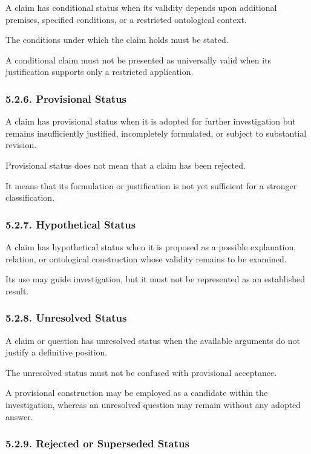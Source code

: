 A claim has conditional status
when its validity depends upon
additional premises, specified
conditions, or a restricted
ontological context.

The conditions under which
the claim holds must be stated.

A conditional claim must not
be presented as universally
valid when its justification
supports only a restricted
application.

\subsubsection*{5.2.6. Provisional Status}

A claim has provisional status
when it is adopted for further
investigation but remains
insufficiently justified,
incompletely formulated, or
subject to substantial revision.

Provisional status does not
mean that a claim has been
rejected.

It means that its formulation
or justification is not yet
sufficient for a stronger
classification.

\subsubsection*{5.2.7. Hypothetical Status}

A claim has hypothetical status
when it is proposed as a possible
explanation, relation, or
ontological construction whose
validity remains to be examined.

Its use may guide investigation,
but it must not be represented
as an established result.

\subsubsection*{5.2.8. Unresolved Status}

A claim or question has unresolved
status when the available
arguments do not justify
a definitive position.

The unresolved status must
not be confused with provisional
acceptance.

A provisional construction may
be employed as a candidate
within the investigation,
whereas an unresolved question
may remain without any adopted
answer.

\subsubsection*{5.2.9. Rejected or Superseded Status}

